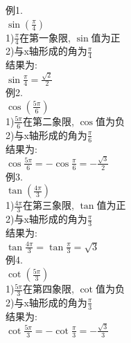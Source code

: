 例1.\\
\phantom{例1}$\displaystyle\sin(\frac{\pi}{4})$\\
1)$\frac{\pi}{4}$在第一象限, $\sin$值为正\\
2)与x轴形成的角为$\frac{\pi}{4}$\\
结果为:\\
$\displaystyle\sin\frac{\pi}{4}=\frac{\sqrt{2}}{2}$\\[1ex]

例2.\\
\phantom{例2}$\displaystyle\cos(\frac{5\pi}{6})$\\
1)$\frac{5\pi}{6}$在第二象限, $\cos$值为负\\
2)与x轴形成的角为$\frac{\pi}{6}$\\
结果为:\\
$\displaystyle\cos\frac{5\pi}{6}=-\cos\frac{\pi}{6}=-\frac{\sqrt{3}}{2}$\\[1ex]

例3.\\
\phantom{例3}$\displaystyle\tan(\frac{4\pi}{3})$\\
1)$\frac{4\pi}{3}$在第三象限, $\tan$值为正\\
2)与x轴形成的角为$\frac{\pi}{3}$\\
结果为:\\
$\displaystyle\tan\frac{4\pi}{3}=\tan\frac{\pi}{3}=\sqrt{3}$\\[1ex]

例4.\\
\phantom{例4}$\displaystyle\cot(\frac{5\pi}{3})$\\
1)$\frac{5\pi}{3}$在第四象限, $\cot$值为负\\
2)与x轴形成的角为$\frac{\pi}{3}$\\
结果为:\\
$\displaystyle\cot\frac{5\pi}{3}=-\cot\frac{\pi}{3}=-\frac{\sqrt{3}}{3}$\\[4ex]

